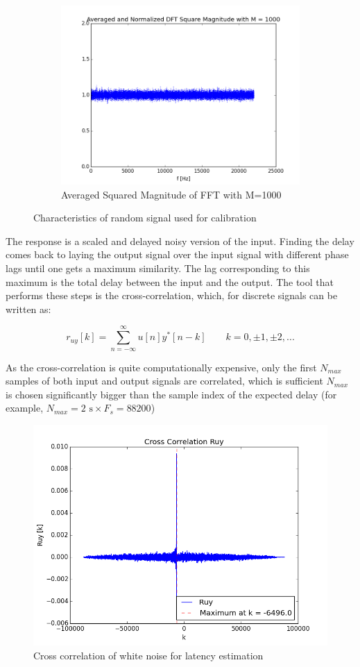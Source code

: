 \begin{figure}[htb]
\begin{subfigure}[b]{0.49\linewidth}
        \includegraphics[width=\linewidth]{files/random_M1000.png}
        \caption{Averaged Squared Magnitude of FFT with M=1000}
        \label{fig:random_M1000}
    \end{subfigure}
	\caption{Characteristics of random signal used for calibration} 
	\label{fig:random}
\end{figure}
The response is a scaled and delayed noisy version of the input. Finding the delay comes back to laying the output signal over the input signal with different phase lags until one gets a maximum similarity. The lag corresponding to this maximum is the total delay between the input and the output. The tool that performs these steps is the cross-correlation, which, for discrete signals can be written as: 

\begin{equation}
	r_{uy}[k] = \sum\limits_{n=-\infty}^{\infty} u[n]y^*[n-k] \hspace{2em} k=0,\pm1,\pm2,...
\end{equation}

As the cross-correlation is quite computationally expensive, only the first $N_{max}$ samples of both input and output signals are correlated, which is sufficient $N_{max}$ is chosen significantly bigger than the sample index of the expected delay (for example, $N_{max}=2  \text{ s} \times F_s = 88200$)

\begin{figure}[htb]
	\centering
	\includegraphics[width=0.6\linewidth]{files/audio_ruy.png}
	\caption{Cross correlation of white noise for latency estimation}
	\label{fig:audio_ruy}
\end{figure}

